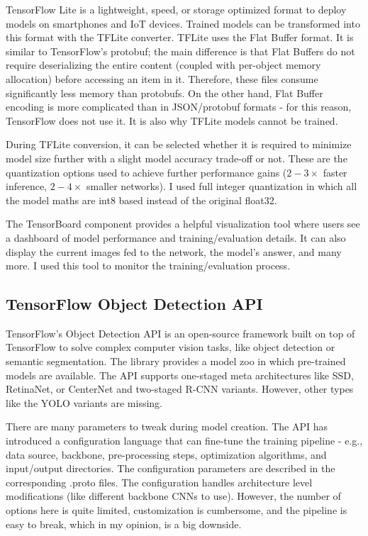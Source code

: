 TensorFlow Lite is a lightweight, speed, or storage optimized format to deploy models on smartphones and IoT devices. Trained models can be transformed into this format with the TFLite converter. TFLite uses the Flat Buffer\cite{Flatbuf} format. It is similar to TensorFlow's protobuf; the main difference is that Flat Buffers do not require deserializing the entire content (coupled with per-object memory allocation) before accessing an item in it. Therefore, these files consume significantly less memory than protobufs. On the other hand, Flat Buffer encoding is more complicated than in JSON/protobuf formats - for this reason, TensorFlow does not use it. It is also why TFLite models cannot be trained.

During TFLite conversion, it can be selected whether it is required to minimize model size further with a slight model accuracy trade-off or not. These are the quantization options used to achieve further performance gains ($2-3\times$ faster inference, $2-4\times$ smaller networks). I used full integer quantization\cite{TensorFlowQuant} in which all the model maths are int8 based instead of the original float32.

The TensorBoard component provides a helpful visualization tool where users see a dashboard of model performance and training/evaluation details. It can also display the current images fed to the network, the model's answer, and many more. I used this tool to monitor the training/evaluation process.

\subsection{TensorFlow Object Detection API}

TensorFlow's Object Detection API\cite{TensorFlowObjDetAPI} is an open-source framework built on top of TensorFlow to solve complex computer vision tasks, like object detection or semantic segmentation. The library provides a model zoo in which pre-trained models are available. The API supports one-staged meta architectures like SSD, RetinaNet, or CenterNet and two-staged R-CNN variants. However, other types like the YOLO variants are missing.

There are many parameters to tweak during model creation. The API has introduced a configuration language that can fine-tune the training pipeline - e.g., data source, backbone, pre-processing steps, optimization algorithms, and input/output directories. The configuration parameters are described in the corresponding .proto files. The configuration handles architecture level modifications (like different backbone CNNs to use). However, the number of options here is quite limited, customization is cumbersome, and the pipeline is easy to break, which in my opinion, is a big downside.

